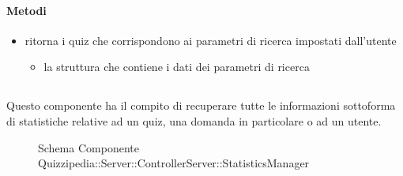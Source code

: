 \paragraph{Metodi}
\begin{itemize}
\item {}
\newline
ritorna i quiz che corrispondono ai parametri di ricerca impostati dall'utente
\newline
{}
\newline
\begin{itemize}
\item {}
\newline
la struttura che contiene i dati dei parametri di ricerca
\end{itemize}
\end{itemize}
\subsection{}
Questo componente ha il compito di recuperare tutte le informazioni sottoforma di statistiche relative ad un quiz, una domanda in particolare o ad un utente.
\begin{figure}[H]
\centering
\noindent{}
\caption[Schema Componente Quizzipedia::Server::ControllerServer::StatisticsManager]{Schema Componente Quizzipedia::Server::ControllerServer::StatisticsManager}
\end{figure}
